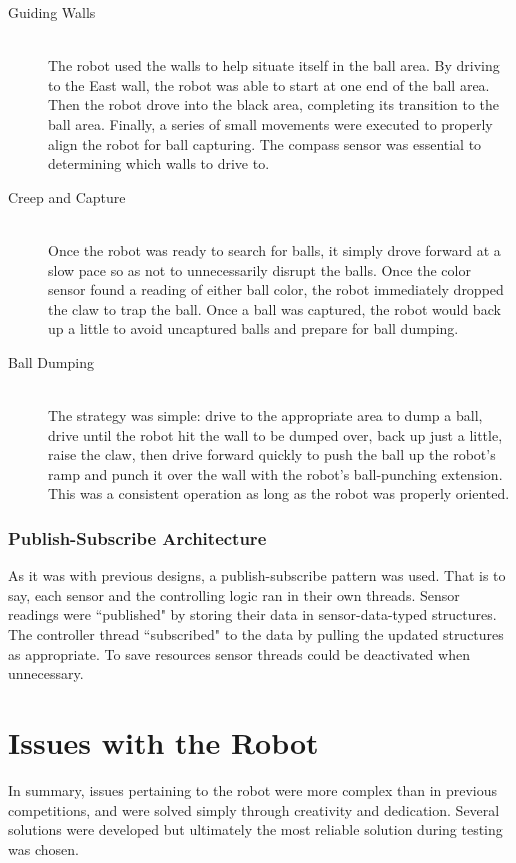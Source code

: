 \documentclass{article}
\begin{document}
\begin{description}
  \item[Guiding Walls] \hfill \\
  The robot used the walls to help situate itself in the ball area. By driving to the East wall, the robot was able to start at one end of the ball area. Then the robot drove into the black area, completing its transition to the ball area. Finally, a series of small movements were executed to properly align the robot for ball capturing. The compass sensor was essential to determining which walls to drive to.

  \item[Creep and Capture] \hfill \\
  Once the robot was ready to search for balls, it simply drove forward at a slow pace so as not to unnecessarily disrupt the balls. Once the color sensor found a reading of either ball color, the robot immediately dropped the claw to trap the ball. Once a ball was captured, the robot would back up a little to avoid uncaptured balls and prepare for ball dumping.

  \item[Ball Dumping] \hfill \\
  The strategy was simple: drive to the appropriate area to dump a ball, drive until the robot hit the wall to be dumped over, back up just a little, raise the claw, then drive forward quickly to push the ball up the robot's ramp and punch it over the wall with the robot's ball-punching extension. This was a consistent operation as long as the robot was properly oriented.
\end{description}

\subsubsection{Publish-Subscribe Architecture}
As it was with previous designs, a publish-subscribe pattern was used. That is to say, each sensor and the controlling logic ran in their own threads. Sensor readings were ``published" by storing their data in sensor-data-typed structures. The controller thread ``subscribed" to the data by pulling the updated structures as appropriate. To save resources sensor threads could be deactivated when unnecessary.

\newpage
\section{Issues with the Robot}
In summary, issues pertaining to the robot were more complex than in previous competitions, and were solved simply through creativity and dedication. Several solutions were developed but ultimately the most reliable solution during testing was chosen. 
\end{document}
